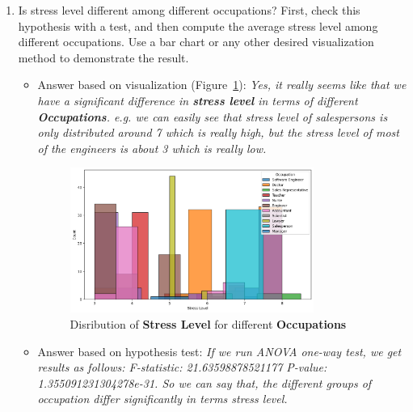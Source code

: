 \documentclass{article}
\begin{document}
\begin{enumerate}
\begin{enumerate}[label=(\alph*)]
        \item Is stress level different among different occupations? First, check this
        hypothesis with a test, and then compute the average stress level among
        different occupations. Use a bar chart or any other desired visualization
        method to demonstrate the result.
        \begin{itemize}
            \item Answer based on visualization (Figure~\ref{fig:Figure_5}):
            \textit{Yes, it really seems like that we have a significant difference in \textbf{stress level} in terms of different \textbf{Occupations}. e.g. we can easily see that stress level of salespersons is only distributed around 7 which is really high, but the stress level of most of the engineers is about 3 which is really low.}
            \begin{figure}[H]  %

                \centering
                \includegraphics[width=0.8\textwidth]{./images/health_distribution_of_stress_level_for_occupations.png}  %
                \caption{Disribution of \textbf{Stress Level} for different \textbf{Occupations}}
                \label{fig:Figure_5}  %
    
            \end{figure}
            
            \item Answer based on hypothesis test:
            \textit{If we run ANOVA one-way test, we get results as follows: F-statistic: 21.63598878521177 P-value: 1.355091231304278e-31. So we can say that, the different groups of occupation differ significantly in terms stress level.}
        \end{itemize}


\end{enumerate}
\end{enumerate}
\end{document}
